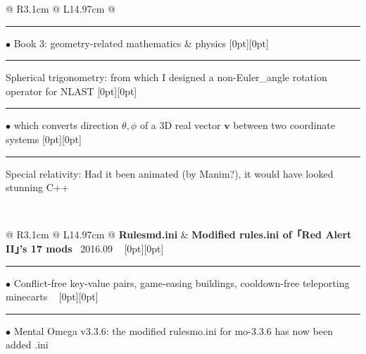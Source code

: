 {{\begin{tabularx}{\linewidth}{@{} R{3.1cm} @{\phantom{d}} L{14.97cm} @{}}
\hspace{-0.26em}\rule[0.25em]{1.0em}{0.5pt}\!\! $\bullet$ {\small Book 3: geometry-related mathematics \& physics} \newline \vspace{-3pt} \hspace{12.5pt} \raisebox{0.18\height}[0pt][0pt]{\vrule width0.5pt height15.0pt} \hspace{-0.26em}\rule[0.25em]{1.0em}{0.5pt}\!\! \raisebox{0.2\height}{\scriptsize $\blacktriangleright$} {\small Spherical trigonometry: from which I designed a non-Euler\_angle rotation operator for NLAST} \newline \vspace{-3pt} \hspace{25.3pt} \raisebox{0.18\height}[0pt][0pt]{\vrule width0.5pt height15.0pt} \hspace{-0.26em}\rule[0.25em]{1.0em}{0.5pt}\!\! $\bullet$ {\small which converts direction $\theta,\phi$ of a 3D real vector $\boldsymbol{v}$ between two coordinate systems} \newline \vspace{-3pt} \hspace{12.5pt} \raisebox{0.09\height}[0pt][0pt]{\vrule width0.5pt height30.0pt} \hspace{-0.26em}\rule[0.25em]{1.0em}{0.5pt}\!\! \raisebox{0.2\height}{\scriptsize $\blacktriangleright$} {\small Special relativity: Had it been animated (by Manim?), it would have looked stunning} \hfill {\small \color{color-detail} C++} \href{https://github.com/ChenZhu-Xie/3_books_with_cpp}{\color{black!50}\faGithub} \\ \Gap\Gap\Gap
\end{tabularx}
\\
\begin{tabularx}{\linewidth}{@{} R{3.1cm} @{\phantom{d}} L{14.97cm} @{}}
	\textbf{Rulesmd.ini} & \hspace{10pt} \textbf{Modified rules.ini of「Red Alert II」's 17 mods} \hfill \textendash\ 2016.09 \newline \vspace{2pt} \ \hspace{-3pt} \raisebox{0.09\height}[0pt][0pt]{\vrule width0.5pt height30.0pt} \hspace{-0.26em}\rule[0.25em]{1.0em}{0.5pt}\!\! $\bullet$ {\small Conflict-free key-value pairs, game-easing buildings, cooldown-free teleporting minecarts} \newline \vspace{-3pt} \ \hspace{-3pt} \raisebox{0.18\height}[0pt][0pt]{\vrule width0.5pt height15.0pt} \hspace{-0.26em}\rule[0.25em]{1.0em}{0.5pt}\!\! $\bullet$ {\small Mental Omega v3.3.6: the modified rulesmo.ini for mo-3.3.6 has now been added} \hfill {\small \color{color-detail} .ini} \href{https://github.com/ChenZhu-Xie/rulesmd.ini}{\color{black!50}\faGithub} \\ \Gap\Gap\Gap

\end{tabularx}}}
